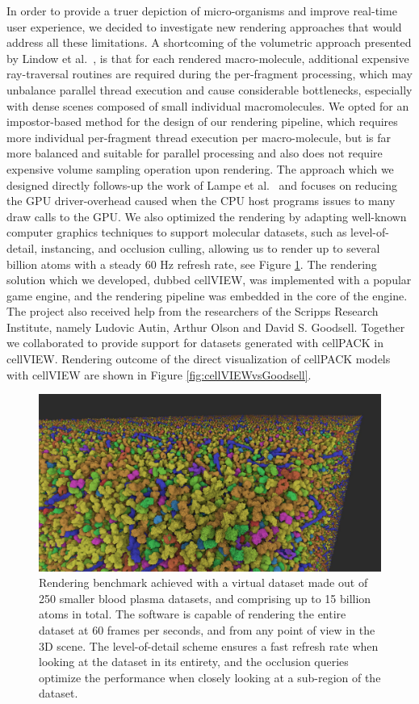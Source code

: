 In order to provide a truer depiction of micro-organisms and improve real-time user experience, we decided to investigate new rendering approaches that would address all these limitations.
A shortcoming of the volumetric approach presented by Lindow et al.~\cite{lindow2012interactive}, is that for each rendered macro-molecule, additional expensive ray-traversal routines are required during the per-fragment processing, which may unbalance parallel thread execution and cause considerable bottlenecks, especially with dense scenes composed of small individual macromolecules.
We opted for an impostor-based method for the design of our rendering pipeline, which requires more individual per-fragment thread execution per macro-molecule, but is far more balanced and suitable for parallel processing and also does not require expensive volume sampling operation upon rendering. 
The approach which we designed directly follows-up the work of Lampe et al.~\cite{lampe2007two} and focuses on reducing the GPU driver-overhead caused when the CPU host programs issues to many draw calls to the GPU.
We also optimized the rendering by adapting well-known computer graphics techniques to support molecular datasets, such as level-of-detail, instancing, and occlusion culling, allowing us to render up to several billion atoms with a steady 60 Hz refresh rate, see Figure \ref{fig:unity-2015-06-22-01-20-37-65}.
The rendering solution which we developed, dubbed cellVIEW, was implemented with a popular game engine, and the rendering pipeline was embedded in the core of the engine.
The project also received help from the researchers of the Scripps Research Institute, namely Ludovic Autin, Arthur Olson and David S. Goodsell.
Together we collaborated to provide support for datasets generated with cellPACK in cellVIEW.
Rendering outcome of the direct visualization of cellPACK models with cellVIEW are shown in Figure \ref{fig:cellVIEWvsGoodsell}.

\begin{figure}
	\centering
	\includegraphics[width=0.85\linewidth]{"graphics/large_scene"}
	\caption{Rendering benchmark achieved with a virtual dataset made out of 250 smaller blood plasma datasets, and comprising up to 15 billion atoms in total. The software is capable of rendering the entire dataset at 60 frames per seconds, and from any point of view in the 3D scene. The level-of-detail scheme ensures a fast refresh rate when looking at the dataset in its entirety, and the occlusion queries optimize the performance when closely looking at a sub-region of the dataset.}
	\label{fig:unity-2015-06-22-01-20-37-65}
\end{figure}

